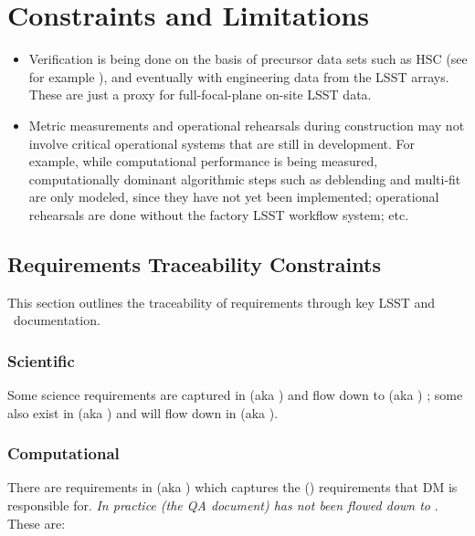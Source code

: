 \section{Constraints and Limitations}

\begin{itemize}

\item Verification is being done on the basis of precursor data sets such as HSC (see for example ), and eventually with engineering data from the LSST arrays. These are just a proxy for full-focal-plane on-site LSST data.

\item Metric measurements and operational rehearsals during construction may not involve critical operational systems that are still in development. For example, while computational performance is being measured, computationally dominant algorithmic steps such as deblending and multi-fit are only modeled, since they have not yet been implemented; operational rehearsals are done without the factory LSST workflow system; etc.

\end{itemize}

\subsection{Requirements Traceability Constraints}

This section outlines the traceability of requirements through key LSST and \product\ documentation.

\subsubsection{Scientific}

Some science requirements are captured in  (aka \LSR) and flow down to  (aka \OSS) ; some also exist in  (aka \DPDD) and will flow down in  (aka \DMSR).

\subsubsection{Computational}

There are requirements in  (aka \DMSR) which captures the  (\OSS) requirements that DM is responsible for. \textit{In practice  (the QA document) has not been flowed down to }. These are:

